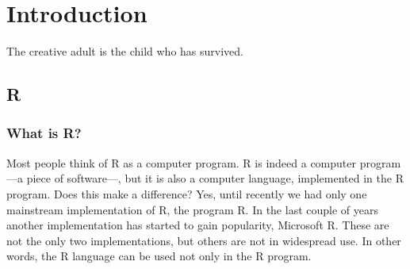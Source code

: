 \documentclass[krantz2,ChapterTOCs]{krantz}\usepackage{knitr}
\begin{document}

\frontmatter

\maketitle


\setcounter{page}{7} %
\tableofcontents
%

\listoffigures
\listoftables
%
%

\mainmatter







\chapter{Introduction}\label{chap:introduction}

\begin{VF}
The creative adult is the child who has survived.

\end{VF}


\section{R}

\subsection{What is R?}

Most people think of R as a computer program. R is indeed a computer program---a piece of software---, but it is also a computer language, implemented in the R program. Does this make a difference? Yes, until recently we had only one mainstream implementation of R, the program R. In the last couple of years another implementation has started to gain popularity, Microsoft R. These are not the only two implementations, but others are not in widespread use. In other words, the R language can be used not only in the R program.
\end{document}
